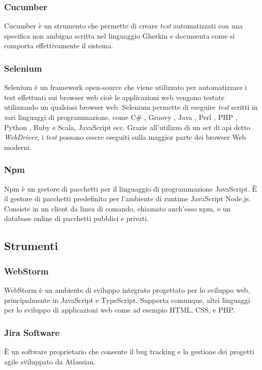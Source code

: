 \subsubsection*{Cucumber}
Cucumber è un strumento che permette di creare \emph{test} automatizzati con una specifica non ambigua scritta nel linguaggio Gherkin e documenta come si comporta effettivamente il sistema.

\subsubsection*{Selenium}
Selenium è un framework open-source che viene utilizzato per automatizzare i test effettuati sui browser web cioè le applicazioni web vengono testate utilizzando un qualsiasi browser web. Selenium permette di eseguire \emph{test} scritti in vari linguaggi di programmazione, come C\# , Groovy , Java , Perl , PHP , Python , Ruby e Scala, JavaScript ecc. Grazie all'utilizzo di un set di \gls{api}\ap{[g]} detto \emph{WebDriver}, i \emph{test} possono essere eseguiti sulla maggior parte dei browser Web moderni.

\subsubsection*{Npm}
 Npm è un gestore di pacchetti per il linguaggio di programmazione JavaScript. È il gestore di pacchetti predefinito per l'ambiente di runtime JavaScript Node.js. Consiste in un client da linea di comando, chiamato anch'esso npm, e un database online di pacchetti pubblici e privati.

\subsection{Strumenti}

\subsubsection*{WebStorm}
WebStorm è un ambiente di sviluppo integrato progettato per lo sviluppo web, principalmente in JavaScript e TypeScript. Supporta comunque, altri linguaggi per lo sviluppo di applicazioni web come ad esempio HTML, CSS, e PHP.

\subsubsection{Jira Software}
È un software proprietario che consente il bug tracking e la gestione dei progetti agile sviluppato da Atlassian.

